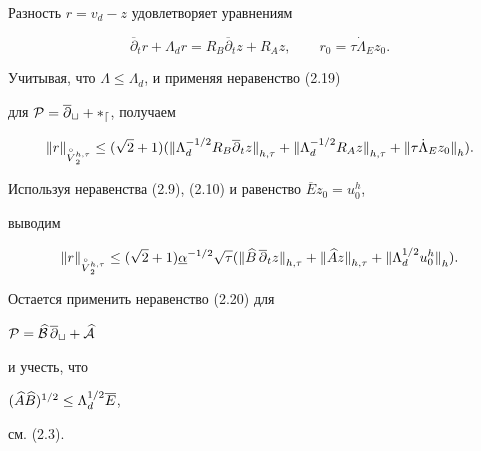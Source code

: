 \begin{pf} Разность $r=v_d-z$ удовлетворяет уравнениям


$$


\overline{\partial}_t r+\Lambda_d r=R_B\overline{\partial}_t z+R_Az,


\qquad r_0=\tau{\Dot\Lambda}_Ez_0.


$$


Учитывая, что $\Lambda\le\Lambda_d$, и применяя неравенство (2.19)


для $\cal P=\overline\partial_t+\Lambda_d$, получаем


$$


{\ver r \ver}_{\overset{\circ}{V}{}_2^{h,\tau}}\le (\sqrt 2+1)


({\ver\Lambda_d^{-1/2}R_B\overline{\partial}_t z\ver}_{h,\tau}+


{\ver\Lambda_d^{-1/2}R_A z\ver}_{h,\tau}+


{\ver \tau{\Dot\Lambda}_Ez_0\ver}_{h}).


$$


Используя неравенства (2.9), (2.10) и равенство $\overline E z_0=u_0^h$,


выводим


$$


{\ver r \ver}_{\overset{\circ}{V}{}_2^{h,\tau}}\le (\sqrt 2+1)


\underline\alpha^{-1/2}\sqrt\tau


({\ver{\bbb}\,\overline{\partial}_t z\ver}_{h,\tau}+


{\ver\aaa z\ver}_{h,\tau}+{\ver \Lambda_d^{1/2}u_0^h\ver}_{h}).


$$


Остается применить неравенство (2.20) для


$\cal P=\widehat B\,\overline\partial_t+\widehat A$


и учесть, что 


$(\widehat A\widehat B)^{1/2}\le \Lambda_d^{1/2}\overline E$,


см. (2.3).


\end{pf}





